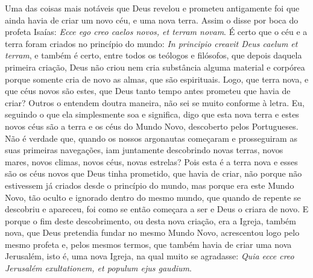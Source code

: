 Uma das coisas mais notáveis que Deus revelou e prometeu antigamente foi
que ainda havia de criar um novo céu, e uma nova terra. Assim o disse
por boca do profeta Isaías: \emph{Ecce ego creo caelos novos, et terram
novam}. É certo que o céu e a terra foram criados no
princípio do mundo: \emph{In principio creavit Deus caelum et terram},
e também é certo, entre todos os teólogos
e filósofos, que depois daquela primeira criação, Deus não criou nem
cria substância alguma material e corpórea porque somente cria de novo
as almas, que são espirituais. Logo, que terra nova, e que céus novos
são estes, que Deus tanto tempo antes prometeu que havia de criar?
Outros o entendem doutra maneira, não sei se muito conforme à letra. Eu,
seguindo o que ela simplesmente soa e significa, digo que esta nova
terra e estes novos céus são a terra e os céus do Mundo Novo, descoberto
pelos Portugueses. Não é verdade que, quando os nossos argonautas
começaram e prosseguiram as suas primeiras navegações, iam juntamente
descobrindo novas terras, novos mares, novos climas, novos céus, novas
estrelas? Pois esta é a terra nova e esses são os céus novos que Deus
tinha prometido, que havia de criar, não porque não estivessem já
criados desde o princípio do mundo, mas porque era este Mundo Novo, tão
oculto e ignorado dentro do mesmo mundo, que quando de repente se
descobriu e apareceu, foi como se então começara a ser e Deus o criara
de novo. E porque o fim deste descobrimento, ou desta nova criação, era
a Igreja, também nova, que Deus pretendia fundar no mesmo Mundo Novo,
acrescentou logo pelo mesmo profeta e, pelos mesmos termos, que também
havia de criar uma nova Jerusalém, isto é, uma nova Igreja, na qual
muito se agradasse: \emph{Quia ecce creo Jerusalém exultationem, et
populum ejus gaudium}.

